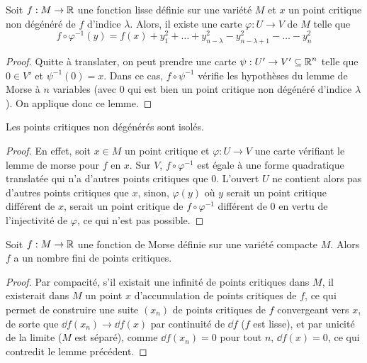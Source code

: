 \begin{lem}[de Morse]
    Soit $f:M\to \operatorname{\mathbb R}$ une fonction lisse définie sur une variété $M$ et $x$ un point critique 
    non dégénéré de $f$ d'indice $\lambda$. 
    Alors, il existe une carte $\varphi:U\to V$ de $M$ telle que 
    \[
        f\circ\varphi^{-1}(y)=f(x)+y_1^2+\dots+y_{n-\lambda}^2-y_{n-\lambda+1}^2-\dots-y_n^2
    \]
\end{lem}

\begin{proof}
    Quitte à translater, on peut prendre une carte $\psi:U'\to V'\subseteq \operatorname{\mathbb R}^n$ telle que 
    $0\in V'$ et $\psi^{-1}(0)=x$.
    Dans ce cas, $f\circ\psi^{-1}$ vérifie les hypothèses du lemme de Morse à $n$ variables 
    (avec $0$ qui est bien un point critique non dégénéré d'indice $\lambda$). 
    On applique donc ce lemme.
\end{proof}

\begin{cor}
    Les points critiques non dégénérés sont isolés.
\end{cor}

\begin{proof}
    En effet, soit $x\in M$ un point critique et $\varphi:U\to V$ une carte vérifiant le 
    lemme de morse pour $f$ en $x$. 
    Sur $V$, $f\circ\varphi^{-1}$ est égale à une forme quadratique translatée qui n'a 
    d'autres points critiques que $0$. 
    L'ouvert $U$ ne contient alors pas d'autres points critiques que $x$, sinon, $\varphi(y)$ 
    où $y$ serait un point critique différent de $x$, serait un point critique de 
    $f\circ\varphi^{-1}$ différent de $0$ en vertu de l'injectivité de $\varphi$, ce qui n'est 
    pas possible.
\end{proof}

\begin{cor}
    Soit $f:M\to\operatorname{\mathbb R}$ une fonction de Morse définie sur une variété compacte $M$. 
    Alors $f$ a un nombre fini de points critiques.
\end{cor}

\begin{proof}
    Par compacité, s'il existait une infinité de points critiques dans $M$, il existerait dans 
    $M$ un point $x$ d'accumulation de points critiques de $f$, ce qui permet de construire 
    une suite $(x_n)$ de points critiques de $f$ convergeant vers $x$, de sorte que 
    $\dd f(x_n)\to \dd f(x)$ par continuité de $\dd f$ ($f$ est lisse), et par unicité de 
    la limite ($M$ est séparé), comme $\dd f(x_n)=0$ pour tout $n$, $\dd f(x) = 0$, ce qui 
    contredit le lemme précédent.
\end{proof}

